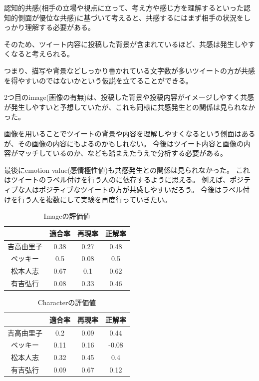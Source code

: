 \documentclass[dvipdfmx]{issj}
\begin{document}
認知的共感(相手の立場や視点に立って、考え方や感じ方を理解するといった認知的側面が優位な共感)に基づいて考えると、共感するにはまず相手の状況をしっかり理解する必要がある。

そのため、ツイート内容に投稿した背景が含まれているほど、共感は発生しやすくなると考えられる。

つまり、描写や背景などしっかり書かれている文字数が多いツイートの方が共感を得やすいのではないかという仮説を立てることができる。


2つ目のimage(画像の有無)は、投稿した背景や投稿内容がイメージしやすく共感が発生しやすいと予想していたが、これも同様に共感発生との関係は見られなかった。

画像を用いることでツイートの背景や内容を理解しやすくなるという側面はあるが、その画像の内容にもよるのかもしれない。
今後はツイート内容と画像の内容がマッチしているのか、なども踏まえたうえで分析する必要がある。

最後にemotion value(感情極性値)も共感発生との関係は見られなかった。
これはツイートのラベル付けを行う人のに依存するように思える。
例えば、ポジティブな人はポジティブなツイートの方が共感しやすいだろう。
今後はラベル付けを行う人を複数にして実験を再度行っていきたい。

\begin{table}[htb]
  \begin{center}
    \caption{Imageの評価値}
    \begin{tabular}{c|ccc} \hline \hline
& 適合率 & 再現率 & 正解率 \\ \hline \hline
吉高由里子 &0.38&0.27&0.48 \\ \hline
ベッキー &0.5&0.08&0.5\\ \hline
松本人志 &0.67&0.1&0.62 \\ \hline
有吉弘行 & 0.08&0.33&0.46 \\ \hline
    \end{tabular}
    \label{tab:tripcode_user}
  \end{center}
\end{table}


\begin{table}[htb]
  \begin{center}
    \caption{Characterの評価値}
    \begin{tabular}{c|ccc} \hline \hline
& 適合率 & 再現率 & 正解率 \\ \hline \hline
吉高由里子 &0.2&0.09&0.44 \\ \hline
ベッキー &0.11&0.16&-0.08\\ \hline
松本人志 &0.32&0.45&0.4\\ \hline
有吉弘行 & 0.09&0.67&0.12 \\ \hline
    \end{tabular}
    \label{tab:tripcode_user}
  \end{center}
\end{table}
\end{document}
